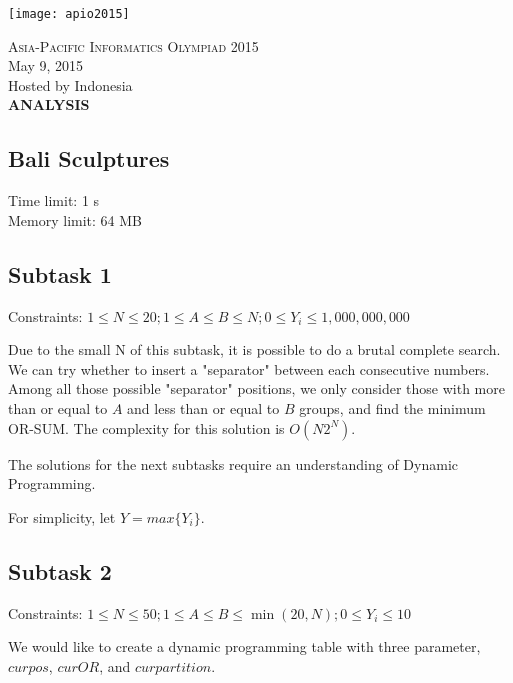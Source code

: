 \documentclass[a4paper]{article}
\begin{document}
\begin{titlepage}
\begin{center}
    \texttt{[image: apio2015]}

    \textsc{\huge Asia-Pacific Informatics Olympiad 2015}\\[0.5cm]

    \LARGE May 9, 2015\\[0.25cm]
    \LARGE Hosted by Indonesia\\[3cm]

    \LARGE \bfseries ANALYSIS\\[0.5cm]

\end{center}
\end{titlepage}

\begin{center}
    \section*{Bali Sculptures}
    Time limit: 1 s\\
    Memory limit: 64 MB
\end{center}

\subsection*{Subtask 1}
Constraints: $1\leq N \leq 20; 1 \leq A \leq B \leq N; 0 \leq Y_i \leq 1,000,000,000$

Due to the small N of this subtask, it is possible to do a brutal complete search. We can try whether to insert a "separator" between each consecutive numbers. Among all those possible "separator" positions, we only consider those with more than or equal to $A$ and less than or equal to $B$ groups, and find the minimum OR-SUM. The complexity for this solution is $O(N2^N)$.

The solutions for the next subtasks require an understanding of Dynamic Programming.

For simplicity, let $Y = max\{Y_i\}$.

\subsection*{Subtask 2}
Constraints: $1\leq N \leq 50; 1 \leq A \leq B \leq \min(20,N); 0 \leq Y_i \leq 10$

We would like to create a dynamic programming table with three parameter, $curpos$, $curOR$, and $curpartition$.
\end{document}
